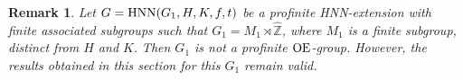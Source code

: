 \documentclass[a4paper,12pt]{article}
\newtheorem{thm}{Theorem}[section]
\newtheorem{cor}[thm]{Corollary}
\newcommand{\Z}{\mathbb{Z}}
\def\OE{{\rm OE}}
\def\hnn {{\rm HNN}}
\def\Z{{\mathbb Z}}
\newtheorem{rem}[thm]{Remark}
\begin{document}
{%







\begin{rem} \label{finite-by-cyclic profinite} 
  Let $G=\hnn(G_1, H, K, f, t)$ %
be a profinite HNN-extension with finite associated subgroups such that $G_1=M_1\rtimes \widehat\Z$, where $M_1$ is a finite subgroup, distinct from $H$ and $K.$ Then $G_1$ is not a profinite $\OE$-group. However, the results obtained in this section for this $G_1$  remain valid.



\end{rem}}
\end{document}
